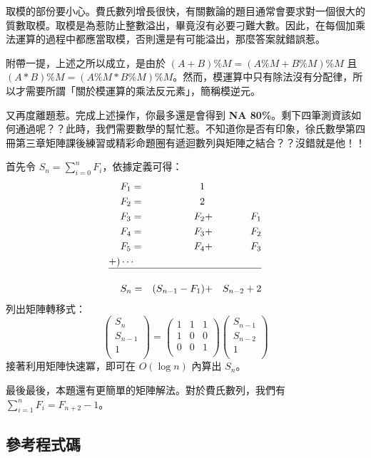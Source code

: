\documentclass[a4paper,10pt]{article}
\begin{document}
取模的部份要小心。費氏數列增長很快，有關數論的題目通常會要求對一個很大的質數取模。取模是為惹防止整數溢出，畢竟沒有必要刁難大數。因此，在每個加乘法運算的過程中都應當取模，否則還是有可能溢出，那麼答案就錯誤惹。

附帶一提，上述之所以成立，是由於 $(A + B) \% M = (A \% M + B \% M) \% M$ 且 $(A * B) \% M = (A \% M * B \% M) \% M$。然而，模運算中只有除法沒有分配律，所以才需要所謂「關於模運算的乘法反元素」，簡稱模逆元。

又再度離題惹。完成上述操作，你最多還是會得到 \textbf{NA 80\%}。剩下四筆測資該如何通過呢？？此時，我們需要數學的幫忙惹。不知道你是否有印象，徐氏數學第四冊第三章矩陣課後練習或精彩命題圈有遞迴數列與矩陣之結合？？沒錯就是他！！

首先令 $S_n = \sum_{i=0}^{n}{F_i}$，依據定義可得：$$\begin{aligned}
& F_1 = & 1 \\
& F_2 = & 2 \\
& F_3 = & F_2 & + & F_1 \\
& F_4 = & F_3 & + & F_2 \\
& F_5 = & F_4 & + & F_3 \\
+) & \cdots \\
\hline \\
& S_n = & (S_{n-1} - F_1) & + & S_{n - 2} + 2
\end{aligned}$$
列出矩陣轉移式：$$
\left(\begin{array}{c}
       S_n \\
       S_{n-1} \\
       1 \\
      \end{array}
\right)
= \left(\begin{array}{ccc}
       1 & 1 & 1 \\
       1 & 0 & 0 \\
       0 & 0 & 1 \\
      \end{array}
\right)
\left(\begin{array}{c}
       S_{n-1} \\
       S_{n-2} \\
       1 \\
      \end{array}
\right)
$$
接著利用矩陣快速冪，即可在 $O(\log n)$ 內算出 $S_n$。

最後最後，本題還有更簡單的矩陣解法。對於費氏數列，我們有 $\sum_{i=1}^{n}{F_i} = F_{n+2} - 1$。

\subsection{參考程式碼}
\end{document}
